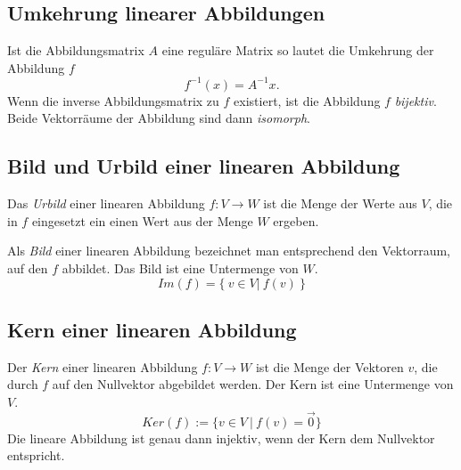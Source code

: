 \subsection{Umkehrung linearer Abbildungen}
\label{sub:umkehrung_linearer_abbildungen}

Ist die Abbildungsmatrix $A$ eine reguläre Matrix so lautet die Umkehrung der Abbildung $f$
\begin{equation}
	f^{-1}(x) = A^{-1}x.
\end{equation}
Wenn die inverse Abbildungsmatrix zu $f$ existiert, ist die Abbildung $f$ \emph{bijektiv}. Beide Vektorräume der 
Abbildung sind dann \emph{isomorph}.

\subsection{Bild und Urbild einer linearen Abbildung}
\label{sub:bild_und_urbild_einer_linearen_abbildung}

Das \emph{Urbild} einer linearen Abbildung $f : V \rightarrow W$ ist die Menge der Werte aus $V$, die in $f$ eingesetzt
ein einen Wert aus der Menge $W$ ergeben.

Als \emph{Bild} einer linearen Abbildung bezeichnet man entsprechend den Vektorraum, auf den $f$ abbildet. 
Das Bild ist eine Untermenge von $W$.
\begin{equation}
	Im(f) = \{ \: v \in V | \: f(v) \:  \}
\end{equation}

\subsection{Kern einer linearen Abbildung} 
\label{sub:kern_einer_linearen_abbildung}

Der \emph{Kern} einer linearen Abbildung $f : V \rightarrow W$ ist die Menge der Vektoren $v$, die durch $f$ auf den 
Nullvektor abgebildet werden. Der Kern ist eine Untermenge von $V$.
\begin{equation}
	Ker(f) := \{v \in V \: | \: f(v) = \overrightarrow{0}\}
\end{equation}
Die lineare Abbildung ist genau dann injektiv, wenn der Kern dem Nullvektor entspricht.



